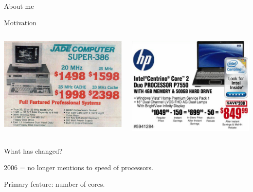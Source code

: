 \documentclass[10pt]{beamer}
\begin{document}
{\begin{frame}{About me}

\end{frame}
}


\begin{frame}{Motivation}
\begin{columns}[T] %
\begin{column}{.5\textwidth}
\includegraphics[width=1.05\linewidth]{img/old_ad}
\end{column}%
\hfill%
\begin{column}{.5\textwidth}
\includegraphics[width=\linewidth]{img/2006_ad}
\end{column}%
\end{columns}
What has changed?
\pause

2006 = no longer mentions to speed of processors.

\pause
Primary feature: number of cores.
\end{frame}
\end{document}
